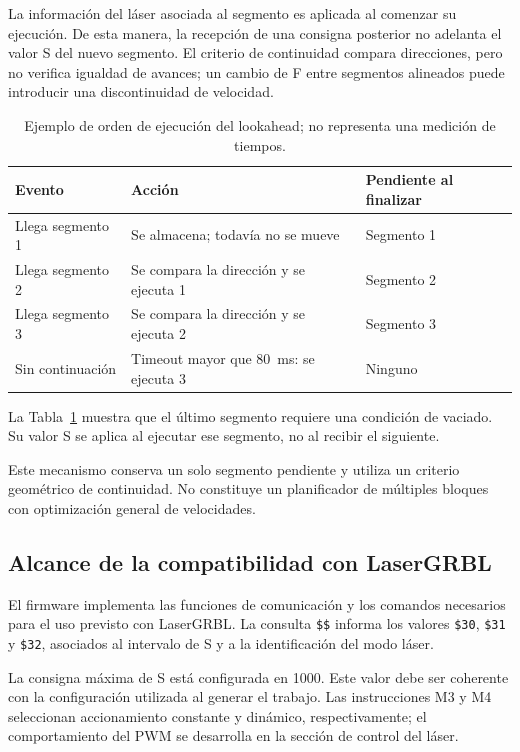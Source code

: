 \documentclass[blue,fullpaper]{ludusofficial}  %
\begin{document}
La información del láser asociada al segmento es aplicada
al comenzar su ejecución. De esta manera, la recepción
de una consigna posterior no adelanta el valor S del nuevo segmento. El criterio de continuidad compara direcciones, pero no verifica igualdad de avances; un cambio de F entre segmentos alineados puede introducir una discontinuidad de velocidad.

\begin{table}[htbp]
\centering\small
\caption{Ejemplo de orden de ejecución del lookahead; no representa una medición de tiempos.}
\label{tab:lookahead-secuencia}
\begin{tabularx}{\linewidth}{lXX}
\hline Evento & Acción & Pendiente al finalizar \\
\hline
Llega segmento 1 & Se almacena; todavía no se mueve & Segmento 1 \\
Llega segmento 2 & Se compara la dirección y se ejecuta 1 & Segmento 2 \\
Llega segmento 3 & Se compara la dirección y se ejecuta 2 & Segmento 3 \\
Sin continuación & Timeout mayor que 80~ms: se ejecuta 3 & Ninguno \\
\hline
\end{tabularx}
\end{table}

La Tabla~\ref{tab:lookahead-secuencia} muestra que el último segmento requiere una condición de vaciado. Su valor S se aplica al ejecutar ese segmento, no al recibir el siguiente.

Este mecanismo conserva un solo segmento pendiente
y utiliza un criterio geométrico de continuidad.
No constituye un planificador de múltiples bloques
con optimización general de velocidades.

\subsection{Alcance de la compatibilidad con LaserGRBL}

El firmware implementa las funciones de comunicación
y los comandos necesarios para el uso previsto
con LaserGRBL. La consulta \texttt{\$\$} informa
los valores \texttt{\$30}, \texttt{\$31} y
\texttt{\$32}, asociados al intervalo de S y
a la identificación del modo láser.

La consigna máxima de S está configurada en 1000.
Este valor debe ser coherente con la configuración
utilizada al generar el trabajo. Las instrucciones M3
y M4 seleccionan accionamiento constante y dinámico,
respectivamente; el comportamiento del PWM se desarrolla
en la sección de control del láser.
\end{document}
